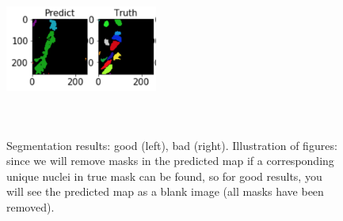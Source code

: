 \documentclass[runningheads]{llncs}
\begin{document}
\begin{figure}[ht]
{{			\includegraphics[width=5cm,height=5cm]{figures/prep/bad3.png}
	}} 
	\caption{Segmentation results: good (left), bad (right). Illustration of figures: since we will remove masks in the predicted map if a corresponding unique nuclei in true mask can be found, so for good results, you will see the predicted map as a blank image (all masks have been removed).}
	\label{fig:res1}
\end{figure}
\begin{figure}[ht]
	\centering
	\setlength{\fboxrule}{0.0pt}
	\label{fig:res2}
\end{figure}
\end{document}
